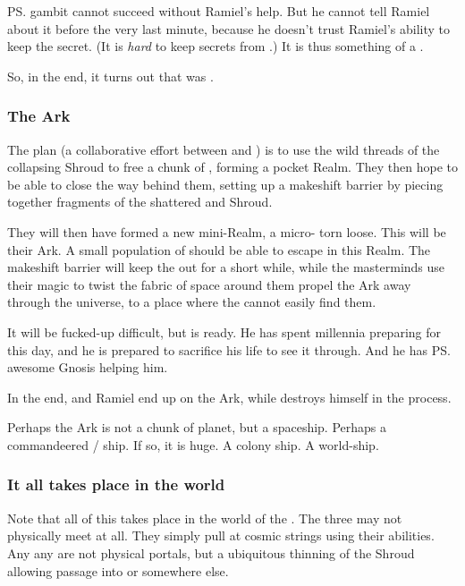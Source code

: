 \ps{\Azraid} gambit cannot succeed without Ramiel's help. 
But he cannot tell Ramiel about it before the very last minute, because he doesn't trust Ramiel's ability to keep the secret. 
(It is \emph{hard} to keep secrets from \Daggerrain.) 
It is thus something of a . 

So, in the end, it turns out that \Azraid{} was . 





\subsubsection{The Ark}
The plan (a collaborative effort between \Azraid{} and \Ishnaruchaefir) is to use the wild threads of the collapsing Shroud to  free a chunk of \Miith{}, forming a pocket Realm. 
They then hope to be able to close the way behind them, setting up a makeshift barrier by piecing together fragments of the shattered \CrystalSphere{} and Shroud.

They will then have formed a new mini-Realm, a micro-\Miith{} torn loose. 
This will be their Ark. 
A small population of \Miithians should be able to escape in this Realm. 
The makeshift barrier will keep the \banes{} out for a short while, while the masterminds use their magic to twist the fabric of space around them propel the Ark away through the universe, to a place where the \banes{} cannot easily find them. 

It will be fucked-up difficult, but \Azraid{} is ready. 
He has spent millennia preparing for this day, and he is prepared to sacrifice his life to see it through. 
And he has \ps{\Ishnaruchaefir} awesome Gnosis helping him. 

In the end, \Ishnaruchaefir{} and Ramiel end up on the Ark, while \Azraid{} destroys himself in the process. 

Perhaps the Ark is not a chunk of planet, but a spaceship. 
Perhaps a commandeered \bane/\resphan{} ship. 
If so, it is huge. 
A colony ship. 
A world-ship. 





\subsubsection{It all takes place in the \matrix{} world}
Note that all of this takes place in the world of the \matrices. 
The three may not physically meet at all. 
They simply pull at cosmic strings using their \vertex{} abilities. 
Any any  are not physical portals, but a ubiquitous thinning of the Shroud allowing passage into \Erebos{} or somewhere else. 






